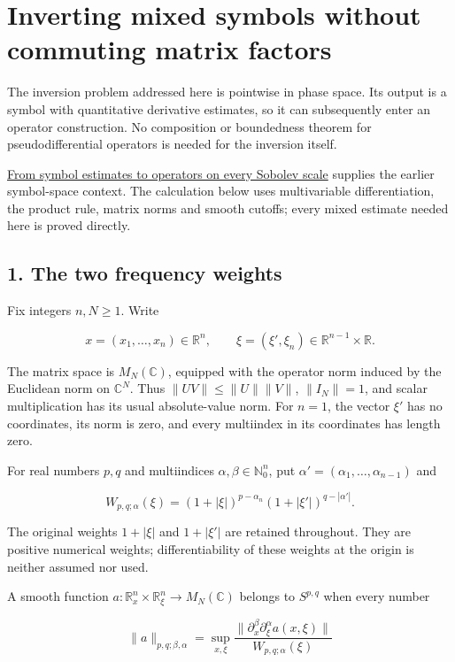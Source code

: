 \documentclass[
  11pt,
]{article}
\author{}
\date{}
\begin{document}
\section{Inverting mixed symbols without commuting matrix
factors}\label{inverting-mixed-symbols-without-commuting-matrix-factors}

The inversion problem addressed here is pointwise in phase space. Its
output is a symbol with quantitative derivative estimates, so it can
subsequently enter an operator construction. No composition or
boundedness theorem for pseudodifferential operators is needed for the
inversion itself.

\href{euclidean-symbol-calculus.pdf}{From symbol estimates to operators
on every Sobolev scale} supplies the earlier symbol-space context. The
calculation below uses multivariable differentiation, the product rule,
matrix norms and smooth cutoffs; every mixed estimate needed here is
proved directly.

\subsection{1. The two frequency
weights}\label{the-two-frequency-weights}

Fix integers \(n,N\geq1\). Write

\[
x=(x_1,\ldots,x_n)\in\mathbb R^n,
\qquad
\xi=(\xi',\xi_n)\in\mathbb R^{n-1}\times\mathbb R.
\tag{MSI1}
\]

The matrix space is \(M_N(\mathbb C)\), equipped with the operator norm
induced by the Euclidean norm on \(\mathbb C^N\). Thus
\(\|UV\|\leq\|U\|\|V\|\), \(\|I_N\|=1\), and scalar multiplication has
its usual absolute-value norm. For \(n=1\), the vector \(\xi'\) has no
coordinates, its norm is zero, and every multiindex in its coordinates
has length zero.

For real numbers \(p,q\) and multiindices
\(\alpha,\beta\in\mathbb N_0^n\), put
\(\alpha'=(\alpha_1,\ldots,\alpha_{n-1})\) and

\[
W_{p,q;\alpha}(\xi)
=(1+|\xi|)^{p-\alpha_n}
 (1+|\xi'|)^{q-|\alpha'|}.
\tag{MSI2}
\]

The original weights \(1+|\xi|\) and \(1+|\xi'|\) are retained
throughout. They are positive numerical weights; differentiability of
these weights at the origin is neither assumed nor used.

A smooth function
\(a:\mathbb R_x^n\times\mathbb R_\xi^n\to M_N(\mathbb C)\) belongs to
\(S^{p,q}\) when every number

\[
\|a\|_{p,q;\beta,\alpha}
=\sup_{x,\xi}
\frac{\|\partial_x^\beta\partial_\xi^\alpha a(x,\xi)\|}
     {W_{p,q;\alpha}(\xi)}
\tag{MSI3}
\]
\end{document}
